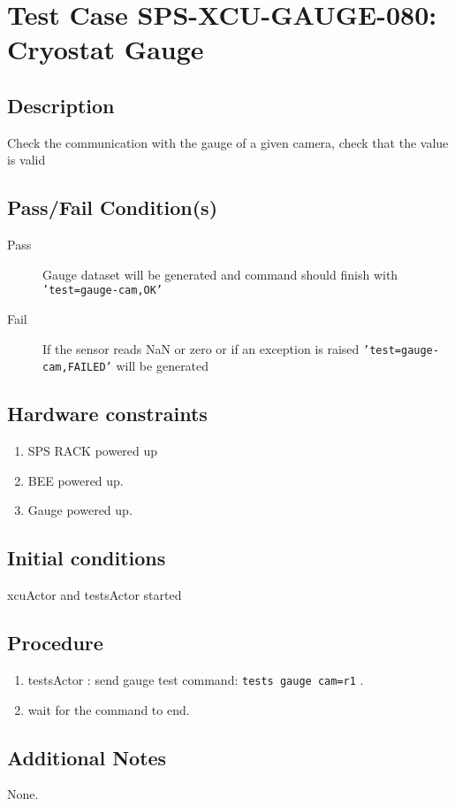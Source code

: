 \section{Test Case SPS-XCU-GAUGE-080: Cryostat Gauge}

\subsection{Description}

Check the communication with the gauge of a given camera, check that the value is valid

\subsection{Pass/Fail Condition(s)}

\begin{description}
\item [Pass] Gauge dataset will be generated and command should finish with \texttt{'test=gauge-cam,OK'}
\item [Fail] If the sensor reads NaN or zero or if an exception is raised \texttt{'test=gauge-cam,FAILED'} will be generated

\end{description}

\subsection{Hardware constraints}

\begin{enumerate}
    \item SPS RACK powered up
    \item BEE powered up.
    \item Gauge powered up.
\end{enumerate}

\subsection{Initial conditions}

xcuActor and testsActor started

\subsection{Procedure}

\begin{enumerate}
    \item testsActor : send gauge test command: \texttt{tests gauge cam=r1} .
    \item wait for the command to end.
\end{enumerate}

\subsection{Additional Notes}
None.
